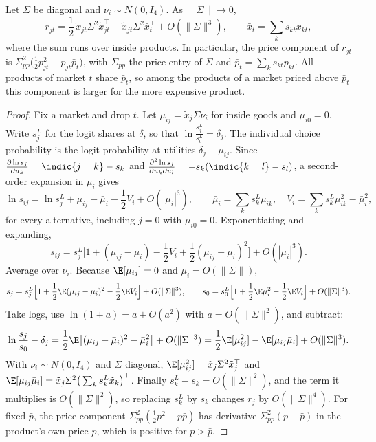 \begin{proposition}\label{prop:C-gap-approx}
Let $\Sigma$ be diagonal and $\nu_i \sim N(0, I_4)$. As $\lVert\Sigma\rVert \to 0$,
\begin{equation}\label{eq:C-gap-approx}
  r_{jt} = \frac{1}{2}\,\tilde x_{jt}\Sigma^2\tilde x_{jt}^\top - \tilde x_{jt}\Sigma^2\bar x_t^\top + O(\lVert\Sigma\rVert^3),
  \qquad \bar x_t = \sum_{k}s_{kt}\tilde x_{kt},
\end{equation}
where the sum runs over inside products. In particular, the price component of $r_{jt}$ is
$\Sigma_{pp}^2\big(\frac{1}{2}p_{jt}^2 - p_{jt}\bar p_t\big)$, with $\Sigma_{pp}$ the price entry of $\Sigma$ and
$\bar p_t = \sum_k s_{kt}p_{kt}$. All products of market $t$ share $\bar p_t$, so among the products of a market priced
above $\bar p_t$ this component is larger for the more expensive product.
\end{proposition}

\begin{proof}
Fix a market and drop $t$. Let $\mu_{ij} = \tilde x_j\Sigma\nu_i$ for inside goods and $\mu_{i0} = 0$. Write
$s^L_j$ for the logit shares at $\delta$, so that $\ln\frac{s^L_j}{s^L_0} = \delta_j$. The individual choice probability is
the logit probability at utilities $\delta_j + \mu_{ij}$. Since $\frac{\partial\ln s_j}{\partial u_k} = \indic\{j = k\} -
s_k$ and $\frac{\partial^2\ln s_j}{\partial u_k\partial u_l} = -s_k(\indic\{k = l\} - s_l)$, a second-order expansion in
$\mu_i$ gives
\[
  \ln s_{ij} = \ln s^L_j + \mu_{ij} - \bar\mu_i - \frac{1}{2}V_i + O(|\mu_i|^3), \qquad
  \bar\mu_i = \sum_k s^L_k\mu_{ik}, \quad V_i = \sum_k s^L_k\mu_{ik}^2 - \bar\mu_i^2 ,
\]
for every alternative, including $j = 0$ with $\mu_{i0} = 0$. Exponentiating and expanding,
\[
  s_{ij} = s^L_j\Big[1 + (\mu_{ij} - \bar\mu_i) - \frac{1}{2}V_i + \frac{1}{2}(\mu_{ij} - \bar\mu_i)^2\Big] + O(|\mu_i|^3).
\]
Average over $\nu_i$. Because $\E[\mu_{ij}] = 0$ and $\mu_i = O(\lVert\Sigma\rVert)$,
\[
  s_j = s^L_j\Big[1 + \frac{1}{2}\E(\mu_{ij} - \bar\mu_i)^2 - \frac{1}{2}\E V_i\Big] + O(\lVert\Sigma\rVert^3), \qquad
  s_0 = s^L_0\Big[1 + \frac{1}{2}\E\bar\mu_i^2 - \frac{1}{2}\E V_i\Big] + O(\lVert\Sigma\rVert^3).
\]
Take logs, use $\ln(1 + a) = a + O(a^2)$ with $a = O(\lVert\Sigma\rVert^2)$, and subtract:
\[
  \ln\frac{s_j}{s_0} - \delta_j = \frac{1}{2}\E\big[(\mu_{ij} - \bar\mu_i)^2 - \bar\mu_i^2\big] + O(\lVert\Sigma\rVert^3)
  = \frac{1}{2}\E[\mu_{ij}^2] - \E[\mu_{ij}\bar\mu_i] + O(\lVert\Sigma\rVert^3).
\]
With $\nu_i \sim N(0, I_4)$ and $\Sigma$ diagonal, $\E[\mu_{ij}^2] = \tilde x_j\Sigma^2\tilde x_j^\top$ and
$\E[\mu_{ij}\bar\mu_i] = \tilde x_j\Sigma^2\big(\sum_k s^L_k\tilde x_k\big)^\top$. Finally $s^L_k - s_k = O(\lVert\Sigma\rVert^2)$,
and the term it multiplies is $O(\lVert\Sigma\rVert^2)$, so replacing $s^L_k$ by $s_k$ changes $r_j$ by $O(\lVert\Sigma\rVert^4)$.
For fixed $\bar p$, the price component $\Sigma_{pp}^2(\frac{1}{2}p^2 - p\bar p)$ has derivative $\Sigma_{pp}^2(p - \bar p)$ in
the product's own price $p$, which is positive for $p > \bar p$.
\end{proof}

